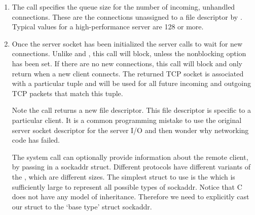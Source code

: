 \begin{enumerate}
  By default, a port is not released immediately when the server socket is closed.
  Instead, the port enters a ``TIME-WAIT'' state.
  This can lead to significant confusion during development because the timeout can make valid networking code appear to fail.

  To be able to immediately reuse a port, specify  before binding to the port.

  \begin{lstlisting}[language=C]
int optval = 1;
setsockopt(sfd, SOL_SOCKET, SO_REUSEADDR, &optval, sizeof(optval));

bind(...);
  \end{lstlisting}

  Here's \href{http://stackoverflow.com/questions/14388706/socket-options-so-reuseaddr-and-so-reuseport-how-do-they-differ-do-they-mean-t}{an extended stackoverflow introductory discussion of  and }.

  \item {}

    The  call specifies the queue size for the number of incoming, unhandled connections.
    These are the connections unassigned to a file descriptor by .
    Typical values for a high-performance server are 128 or more.

  \item {}

  Once the server socket has been initialized the server calls  to wait for new connections.
  Unlike   and , this call will block, unless the nonblocking option has been set.
  If there are no new connections, this call will block and only return when a new client connects.
  The returned TCP socket is associated with a particular tuple  and will be used for all future incoming and outgoing TCP packets that match this tuple.

  Note the  call returns a new file descriptor.
  This file descriptor is specific to a particular client.
  It is a common programming mistake to use the original server socket descriptor for the server I/O and then wonder why networking code has failed.

  The  system call can optionally provide information about the remote client, by passing in a sockaddr struct.
  Different protocols have different variants of the , which are different sizes.
  The simplest struct to use is the  which is sufficiently large to represent all possible types of sockaddr.
  Notice that C does not have any model of inheritance.
  Therefore we need to explicitly cast our struct to the `base type' struct sockaddr.


\end{enumerate}
